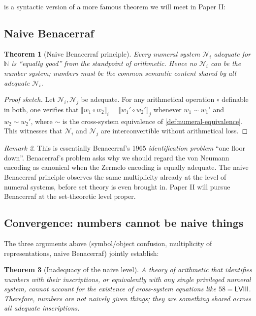\documentclass[12pt]{article}
\newtheorem{theorem}{Theorem}[section]
\theoremstyle{definition}
\theoremstyle{remark}
\newtheorem{remark}[theorem]{Remark}
\begin{document}
 is a syntactic version of a more famous
theorem we will meet in Paper II:

\subsection{Naive Benacerraf}

\begin{theorem}[Naive Benacerraf principle]
\label{thm:naive-benacerraf}
Every numeral system $\mathcal{N}_i$ adequate for $\mathbb{N}$ is
``equally good'' from the standpoint of arithmetic. Hence no
$\mathcal{N}_i$ can be \emph{the} number system; numbers must be the
common semantic content shared by all adequate $\mathcal{N}_i$.
\end{theorem}

\begin{proof}[Proof sketch]
Let $\mathcal{N}_i, \mathcal{N}_j$ be adequate. For any
arithmetical operation $\circ$ definable in both, one verifies that
$\llbracket w_1 \circ w_2 \rrbracket_i = \llbracket w_1' \circ w_2'
\rrbracket_j$ whenever $w_1 \sim w_1'$ and $w_2 \sim w_2'$, where $\sim$
is the cross-system equivalence of \cref{def:numeral-equivalence}. This
witnesses that $\mathcal{N}_i$ and $\mathcal{N}_j$ are interconvertible
without arithmetical loss.
\end{proof}

\begin{remark}
This is essentially Benacerraf's 1965 \emph{identification problem}
``one floor down''. Benacerraf's problem asks why we should regard the
von Neumann encoding as canonical when the Zermelo encoding is equally
adequate. The naive Benacerraf principle observes the same multiplicity
already at the level of numeral systems, before set theory is even
brought in. Paper II will pursue Benacerraf at the set-theoretic level
proper.
\end{remark}

\subsection{Convergence: numbers cannot be naive things}

The three arguments above (symbol/object confusion, multiplicity of
representations, naive Benacerraf) jointly establish:

\begin{theorem}[Inadequacy of the naive level]
\label{thm:naive-inadequate}
A theory of arithmetic that identifies numbers with their inscriptions,
or equivalently with any single privileged numeral system, cannot account
for the existence of cross-system equations like $58 = \mathsf{LVIII}$.
Therefore, numbers are not naively given things; they are something
shared across all adequate inscriptions.
\end{theorem}
\end{document}
